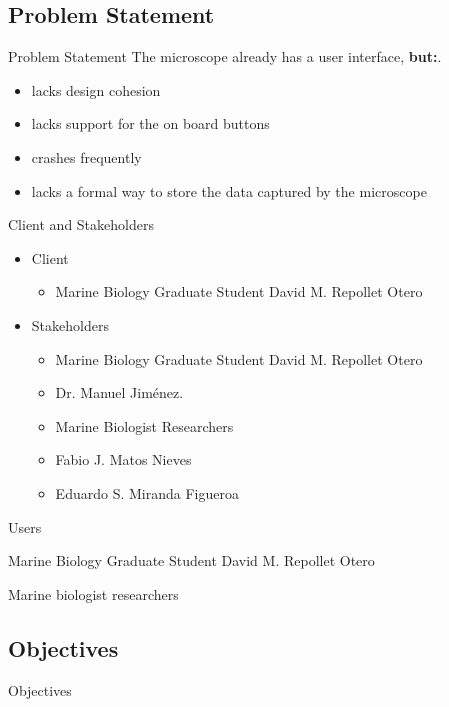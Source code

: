 \documentclass[14pt, aspectratio=169]{beamer}
\begin{document}
\subsection{Problem Statement}
\begin{frame}{Problem Statement}
	The microscope already has a user interface, \large\textbf{but:}\textnormal.
	\begin{itemize}
		\item lacks design cohesion
		\item lacks support for the on board buttons
		\item crashes frequently
		\item lacks a formal way to store the data captured by the microscope
	\end{itemize}
\end{frame}
\begin{frame}{Client and Stakeholders}
	\begin{itemize}
		\item Client
		      \begin{itemize}
			      \item Marine Biology Graduate Student David M. Repollet Otero
		      \end{itemize}
		\item Stakeholders
		      \begin{itemize}
			      \item Marine Biology Graduate Student David M. Repollet Otero
			      \item Dr. Manuel Jiménez.
			      \item Marine Biologist Researchers
			      \item Fabio J. Matos Nieves
			      \item Eduardo S. Miranda Figueroa
		      \end{itemize}
	\end{itemize}
\end{frame}
\begin{frame}{Users}
	\item Marine Biology Graduate Student David M. Repollet Otero
	\item Marine biologist researchers
\end{frame}
\subsection{Objectives}
\begin{frame}{Objectives}

\end{frame}
\end{document}
